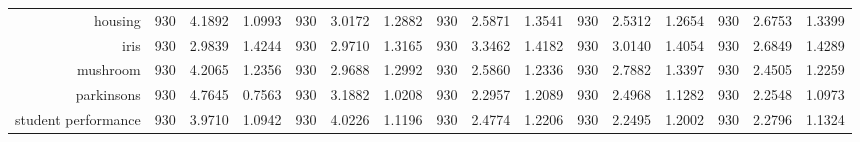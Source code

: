 \begin{table}[H]
{\begin{tabular}{rccccccccccccccc}
			housing                             & 930                                      & 4.1892                                                                    & 1.0993          & 930                            & 3.0172          & 1.2882          & 930                             & 2.5871          & 1.3541          & 930                             & \cellcolor[rgb]{ .776,  .937,  .808}\textcolor[rgb]{ 0,  .38,  0}{2.5312} & 1.2654          & 930                             & 2.6753                                                                             & 1.3399          \\
			iris                                & 930                                      & 2.9839                                                                    & 1.4244          & 930                            & 2.9710          & 1.3165          & 930                             & 3.3462          & 1.4182          & 930                             & 3.0140                                                                    & 1.4054          & 930                             & \cellcolor[rgb]{ .776,  .937,  .808}\textcolor[rgb]{ 0,  .38,  0}{2.6849}          & 1.4289          \\
			mushroom                            & 930                                      & 4.2065                                                                    & 1.2356          & 930                            & 2.9688          & 1.2992          & 930                             & 2.5860          & 1.2336          & 930                             & 2.7882                                                                    & 1.3397          & 930                             & \cellcolor[rgb]{ .776,  .937,  .808}\textcolor[rgb]{ 0,  .38,  0}{2.4505}          & 1.2259          \\
			parkinsons                          & 930                                      & 4.7645                                                                    & 0.7563          & 930                            & 3.1882          & 1.0208          & 930                             & 2.2957          & 1.2089          & 930                             & 2.4968                                                                    & 1.1282          & 930                             & \cellcolor[rgb]{ .776,  .937,  .808}\textcolor[rgb]{ 0,  .38,  0}{2.2548}          & 1.0973          \\
			student performance                 & 930                                      & 3.9710                                                                    & 1.0942          & 930                            & 4.0226          & 1.1196          & 930                             & 2.4774          & 1.2206          & 930                             & \cellcolor[rgb]{ .776,  .937,  .808}\textcolor[rgb]{ 0,  .38,  0}{2.2495} & 1.2002          & 930                             & 2.2796                                                                             & 1.1324          \\

\end{tabular}}
\end{table}
